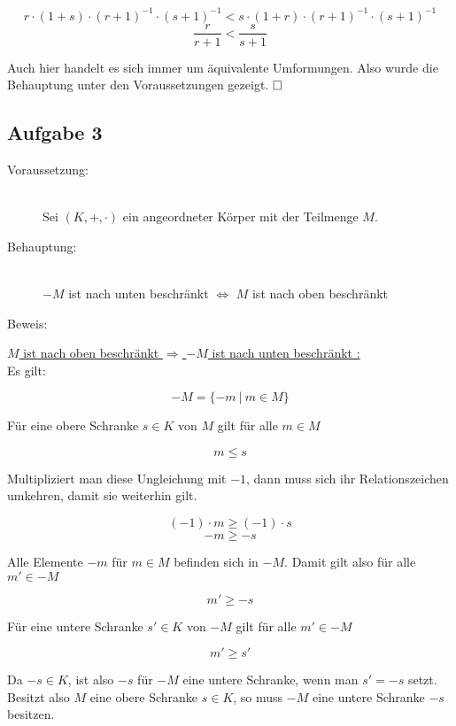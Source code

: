 \documentclass[11pt, a4paper]{article}
\begin{document}
		\[ r\cdot (1+s) \cdot (r+1)^{-1} \cdot (s+1)^{-1} < s \cdot (1+r) \cdot (r+1)^{-1} \cdot (s+1)^{-1} \]
		\[ \dfrac{r}{r+1} < \dfrac{s}{s+1} \]

		Auch hier handelt es sich immer um äquivalente Umformungen. Also wurde die Behauptung unter den Voraussetzungen gezeigt. $\hfill\Box$

	\newpage

	\subsection*{Aufgabe 3}

		\begin{description}
			\item[Voraussetzung:] \hfill \\
				Sei $(K,+,\cdot)$ ein angeordneter Körper mit der Teilmenge $M$. \hfill 
			\item[Behauptung:] \hfill \\
				$-M$ ist nach unten beschränkt $\Leftrightarrow$ $M$ ist nach oben beschränkt \hfill 
			\item[Beweis:] 
		\end{description}

		\underline{$M$ ist nach oben beschränkt $\Rightarrow$ $-M$ ist nach unten beschränkt :} \\

		Es gilt:

		\[ -M = \{-m \ | \ m\in M \} \]

		Für eine obere Schranke $s \in K$ von $M$ gilt für alle $m \in M$

		\[ m \leq s \]

		Multipliziert man diese Ungleichung mit $-1$, dann muss sich ihr Relationszeichen umkehren, damit sie weiterhin gilt.

		\[ (-1)\cdot m \geq (-1)\cdot s \]
		\[ -m \geq -s \]

		Alle Elemente $-m$ für $m \in M$ befinden sich in $-M$. Damit gilt also für alle $m' \in -M$

		\[ m' \geq -s \]

		Für eine untere Schranke $s' \in K$ von $-M$ gilt für alle $m' \in -M$

		\[ m' \geq s' \]

		Da $-s \in K$, ist also $-s$ für $-M$ eine untere Schranke, wenn man $s'=-s$ setzt. Besitzt also $M$ eine obere Schranke $s \in K$, so muss $-M$ eine untere Schranke $-s$ besitzen.\\
\end{document}
